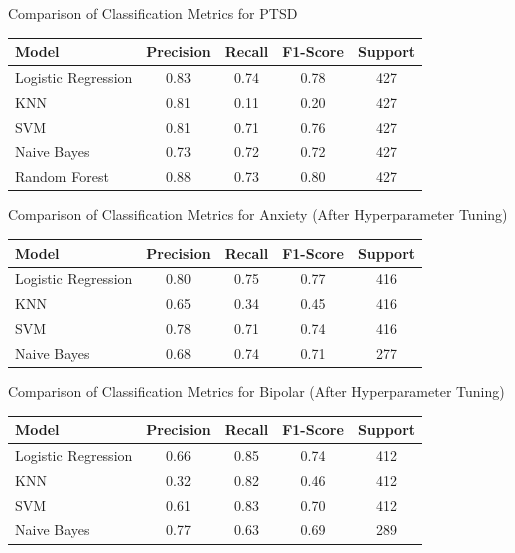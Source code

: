 \begin{center}
\vspace{0.25in}
Comparison of Classification Metrics for PTSD
\begin{tabular}{|l|c|c|c|c|}
\hline
\textbf{Model} & \textbf{Precision} & \textbf{Recall} & \textbf{F1-Score} & \textbf{Support} \\ \hline
Logistic Regression & 0.83 & 0.74 & 0.78 & 427 \\ \hline
KNN                & 0.81 & 0.11 & 0.20 & 427 \\ \hline
SVM                & 0.81 & 0.71 & 0.76 & 427 \\ \hline
Naive Bayes        & 0.73 & 0.72 & 0.72 & 427 \\ \hline
Random Forest      & 0.88 & 0.73 & 0.80 & 427 \\ \hline
\end{tabular}

\vspace{0.25in}
Comparison of Classification Metrics for Anxiety (After Hyperparameter Tuning)
\begin{tabular}{|l|c|c|c|c|}
\hline
\textbf{Model} & \textbf{Precision} & \textbf{Recall} & \textbf{F1-Score} & \textbf{Support} \\ \hline
Logistic Regression & 0.80 & 0.75 & 0.77 & 416 \\ \hline
KNN                & 0.65 & 0.34 & 0.45 & 416 \\ \hline
SVM                & 0.78 & 0.71 & 0.74 & 416 \\ \hline
Naive Bayes        & 0.68 & 0.74 & 0.71 & 277 \\ \hline
\end{tabular}

\vspace{0.25in}

Comparison of Classification Metrics for Bipolar (After Hyperparameter Tuning)
\begin{tabular}{|l|c|c|c|c|}
\hline
\textbf{Model} & \textbf{Precision} & \textbf{Recall} & \textbf{F1-Score} & \textbf{Support} \\ \hline
Logistic Regression & 0.66 & 0.85 & 0.74 & 412 \\ \hline
KNN                & 0.32 & 0.82 & 0.46 & 412 \\ \hline
SVM                & 0.61 & 0.83 & 0.70 & 412 \\ \hline
Naive Bayes        & 0.77 & 0.63 & 0.69 & 289 \\ \hline
\end{tabular}


\end{center}
